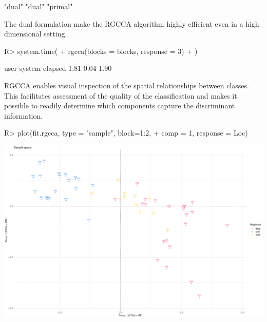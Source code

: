 \documentclass[
]{jss}
\begin{document}
\footnotesize

\begin{CodeChunk}
\begin{CodeOutput}
[1] "dual"   "dual"   "primal"
\end{CodeOutput}
\end{CodeChunk}

\normalsize

The dual formulation make the RGCCA algorithm highly efficient even in a
high dimensional setting.

\footnotesize

\begin{CodeChunk}
\begin{CodeInput}
R> system.time(
+   rgcca(blocks = blocks, response = 3)
+ )
\end{CodeInput}
\begin{CodeOutput}
   user  system elapsed 
   1.81    0.04    1.90 
\end{CodeOutput}
\end{CodeChunk}

\normalsize

RGCCA enables visual inspection of the spatial relationships between
classes. This facilitates assessment of the quality of the
classification and makes it possible to readily determine which
components capture the discriminant information.

\footnotesize

\begin{CodeChunk}
\begin{CodeInput}
R> plot(fit.rgcca, type = "sample", block=1:2,
+      comp = 1, response = Loc)
\end{CodeInput}


\begin{center}\includegraphics{RGCCA_vignette_files/figure-latex/unnamed-chunk-37-1} \end{center}

\end{CodeChunk}
\end{document}

